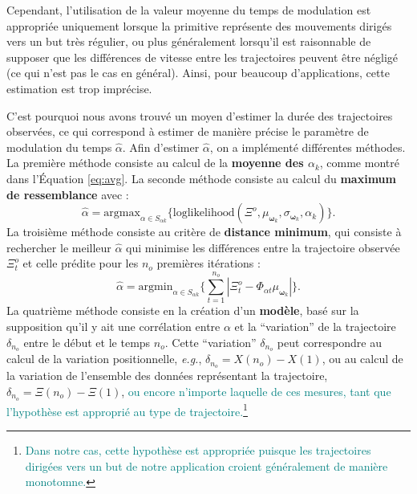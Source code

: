 \documentclass[utf8]{frontiersSCNS} %
\newcommand{\toimprove}[1]{\textcolor{teal}{#1}}
\newcommand{\todo}[1]{\textcolor{red}{\textbf{/*#1*/}}}
\begin{document}
Cependant, l'utilisation de la valeur moyenne du temps de modulation est appropriée uniquement lorsque la primitive représente des mouvements dirigés vers un but très régulier, ou plus généralement lorsqu'il est raisonnable de supposer que les différences de vitesse entre les trajectoires peuvent être négligé (ce qui n'est pas le cas en général). Ainsi, pour beaucoup d'applications, cette estimation est trop imprécise.

C'est pourquoi nous avons trouvé un moyen d'estimer la durée des trajectoires observées, ce qui correspond à estimer de manière précise le paramètre de modulation du temps $\hat{\alpha}$.
Afin d'estimer $\hat{\alpha}$, on a implémenté différentes méthodes.
La première méthode consiste au calcul de la \textbf{moyenne des $\alpha_k$}, comme montré dans l'Équation \ref{eq:avg}. La seconde méthode consiste au calcul du \textbf{maximum de ressemblance }
avec :
\begin{equation}
\label{eq:ml}
\hat{\alpha} = \mathrm{argmax}_{\alpha \in S_{\alpha k}}\{\mathrm{loglikelihood}(\Xi^o,\mu_{\boldsymbol{\omega}_k}, \sigma_{\boldsymbol{\omega}_k}, \alpha_k)\} .
\end{equation} 
La troisième méthode consiste au critère de \textbf{distance minimum}, qui consiste à rechercher le meilleur $\hat{\alpha}$ qui minimise les différences entre la trajectoire observée  $\Xi^o_t$ et celle prédite pour les $n_o$ premières itérations :
\begin{equation}
\label{eq:minDist}
\hat{\alpha} =\mathrm{argmin}_{\alpha \in S_{\alpha k}} \{\sum_{t=1}^{{n_o}} |\Xi^o_t - \Phi_{\alpha t} \mu_{\boldsymbol{\omega}_k}|\} .
\end{equation} 
La quatrième méthode consiste en la création d'un \textbf{modèle}, 
basé sur la supposition qu'il y ait une corrélation entre $\alpha$ et la ``variation'' de la trajectoire $\delta_{n_o}$  entre le début et le temps $n_o$. Cette ``variation'' $\delta_{n_o}$ peut correspondre au calcul de la variation positionnelle, \textit{e.g.}, $\delta_{n_o} = X(n_o) - X(1)$,  ou au calcul de la variation de l'ensemble des données représentant la trajectoire, $ \delta_{n_o} =\Xi(n_o) - \Xi(1)$, \toimprove{ou encore n'importe laquelle de ces mesures, tant que l'hypothèse est approprié au type de trajectoire.}\footnote{\toimprove{Dans notre cas, cette hypothèse est appropriée puisque les trajectoires dirigées vers un but de notre application croient généralement de manière monotomne.} }
\end{document}
